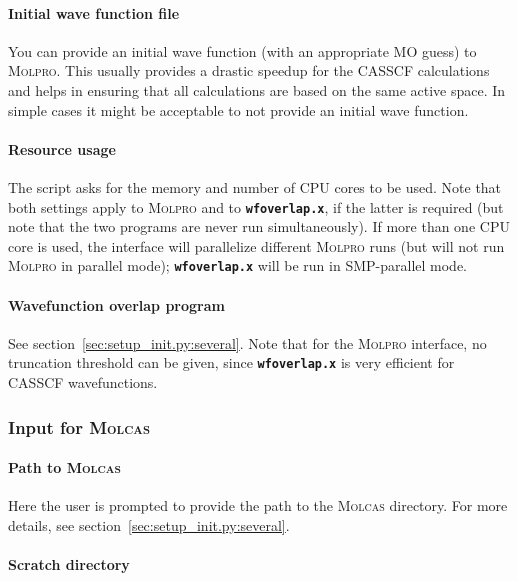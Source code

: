\documentclass[a4paper,10pt,DIV=15,openany]{scrbook}
\newcommand{\ttt}[1]{\textbf{\texttt{#1}}}
\begin{document}
\paragraph{Initial wave function file}

You can provide an initial wave function (with an appropriate MO guess) to \textsc{Molpro}. This usually provides a drastic speedup for the CASSCF calculations and helps in ensuring that all calculations are based on the same active space. In simple cases it might be acceptable to not provide an initial wave function.

\paragraph{Resource usage}

The script asks for the memory and number of CPU cores to be used. Note that both settings apply to \textsc{Molpro} and to \ttt{wfoverlap.x}, if the latter is required (but note that the two programs are never run simultaneously).
If more than one CPU core is used, the interface will parallelize different \textsc{Molpro} runs (but will not run \textsc{Molpro} in parallel mode); \ttt{wfoverlap.x} will be run in SMP-parallel mode.

\paragraph{Wavefunction overlap program}

See section~\ref{sec:setup_init.py:several}. Note that for the \textsc{Molpro} interface, no truncation threshold can be given, since \ttt{wfoverlap.x} is very efficient for CASSCF wavefunctions.

\subsubsection{Input for \textsc{Molcas}}\label{sec:setup_init.py:molcas}

\paragraph{Path to \textsc{Molcas}}

Here the user is prompted to provide the path to the \textsc{Molcas} directory. 
For more details, see section~\ref{sec:setup_init.py:several}.

\paragraph{Scratch directory}
\end{document}
